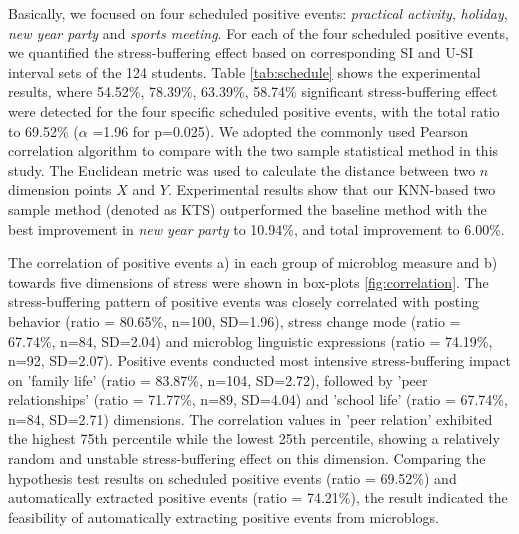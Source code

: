 Basically, we focused on four scheduled positive events:
\emph{practical activity}, \emph{holiday}, \emph{new year party} and \emph{sports meeting}.
For each of the four scheduled positive events,
we quantified the stress-buffering effect based on corresponding SI and U-SI interval sets of the 124 students.
Table \ref{tab:schedule} shows the experimental results,
where 54.52\%, 78.39\%, 63.39\%, 58.74\% significant stress-buffering effect were detected for the four specific scheduled positive events,
with the total ratio to 69.52\% ($\alpha$ =1.96 for p=0.025).
We adopted the commonly used Pearson correlation algorithm to compare with the two sample statistical method in this study.
The Euclidean metric was used to calculate the distance between two $n$ dimension points $X$ and $Y$.
Experimental results show that our KNN-based two sample method (denoted as KTS) outperformed the baseline method
with the best improvement in \emph{new year party} to 10.94\%,
and total improvement to 6.00\%.

\begin{table}[H]
\begin{center}
\caption{\small{Quantify the impact of scheduled positive school events using KTS (the KNN-based two sample method adopted in this research) and baseline method.}}
\label{tab:schedule}
\end{center}
\end{table}


The correlation of positive events a) in each group of microblog measure
and b) towards five dimensions of stress
were shown in box-plots \ref{fig:correlation}.
The stress-buffering pattern of positive events
was closely correlated with posting behavior (ratio = 80.65\%, n=100, SD=1.96),
stress change mode (ratio = 67.74\%, n=84, SD=2.04) and microblog linguistic expressions (ratio = 74.19\%, n=92, SD=2.07).
Positive events conducted most intensive stress-buffering impact on 'family life' (ratio = 83.87\%, n=104, SD=2.72),
followed by 'peer relationships' (ratio = 71.77\%, n=89, SD=4.04) and 'school life' (ratio = 67.74\%, n=84, SD=2.71) dimensions.
The correlation values in 'peer relation'
exhibited the highest 75th percentile while the lowest 25th percentile,
showing a relatively random and unstable stress-buffering effect on this dimension.
Comparing the hypothesis test results on scheduled positive events (ratio = 69.52\%)
and automatically extracted positive events (ratio = 74.21\%),
the result indicated the feasibility of automatically extracting positive events from microblogs.

